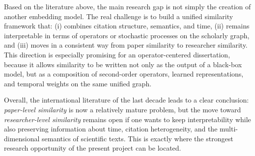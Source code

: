 \documentclass[11pt]{article}
\begin{document}
Based on the literature above, the main research gap is not simply the creation of another embedding model. The real challenge is to build a unified similarity framework that: (i) combines citation structure, semantics, and time, (ii) remains interpretable in terms of operators or stochastic processes on the scholarly graph, and (iii) moves in a consistent way from paper similarity to researcher similarity. This direction is especially promising for an operator-centered dissertation, because it allows similarity to be written not only as the output of a black-box model, but as a composition of second-order operators, learned representations, and temporal weights on the same unified graph.

Overall, the international literature of the last decade leads to a clear conclusion: \emph{paper-level similarity} is now a relatively mature problem, but the move toward \emph{researcher-level similarity} remains open if one wants to keep interpretability while also preserving information about time, citation heterogeneity, and the multi-dimensional semantics of scientific texts. This is exactly where the strongest research opportunity of the present project can be located.




\end{document}
